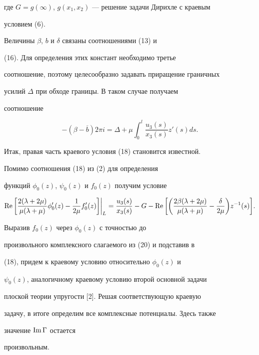 где $G = g(\infty)$, $g(x_1,x_2)$ --- решение задачи Дирихле с краевым


условием (6).





Величины $\beta$, $b$ и $\delta$ связаны соотношениями (13) и


(16). Для определения этих констант необходимо третье


соотношение, поэтому целесообразно задавать приращение граничных


усилий $\Delta$ при обходе границы. В таком случае получаем


соотношение


$$


-(\beta - \overline{b}) 2\pi i = \Delta + \mu\int_0^l


\frac{u_3(s)}{x_3(s)} z'(s) ds.


$$


Итак, правая часть краевого условия (18) становится известной.


Помимо соотношения (18) из (2) для определения


функций $\phi_0(z)$, $\psi_0(z)$ и $f_0(z)$ получим условие


\begin{equation}


\re\bigg[\frac{2(\lambda + 2 \mu)}{\mu(\lambda + \mu)} \phi_0'(z) -


\frac{1}{2\mu} f_0'(z)\bigg]\bigg|_{L} = \frac{u_3(s)}{x_3(s)} - G -


\re\bigg[\bigg(\frac{2\beta(\lambda + 2 \mu)}{\mu(\lambda + \mu)} -


\frac{\delta}{2\mu}\bigg) z^{-1}(s)\bigg]. 


\end{equation}


Выразив $f_0(z)$ через $\phi_0(z)$ с точностью до


произвольного комплексного слагаемого из (20) и подставив в


(18), придем к краевому условию относительно $\phi_0(z)$ и


$\psi_0(z)$, аналогичному краевому условию второй основной задачи


плоской теории упругости [2]. Решая соответствующую краевую


задачу, в итоге определим все комплексные потенциалы. Здесь также


значение $\operatorname{Im} \Gamma$ остается


произвольным.





